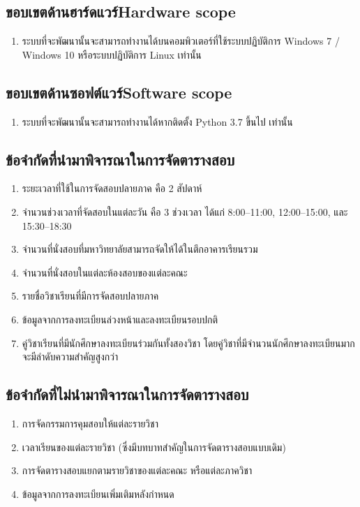 \subsection{\ifcpe ขอบเขตด้านฮาร์ดแวร์\else Hardware scope\fi}
\begin{enumerate}
    \item ระบบที่จะพัฒนานั้นจะสามารถทำงานได้บนคอมพิวเตอร์ที่ใช้ระบบปฏิบัติการ Windows 7 / Windows 10 หรือระบบปฏิบัติการ Linux เท่านั้น
\end{enumerate}
\subsection{\ifcpe ขอบเขตด้านซอฟต์แวร์\else Software scope\fi}
\begin{enumerate}
    \item ระบบที่จะพัฒนานั้นจะสามารถทำงานได้หากติดตั้ง Python 3.7 ขึ้นไป เท่านั้น 
\end{enumerate}
\subsection{ข้อจำกัดที่นำมาพิจารณาในการจัดตารางสอบ}
\begin{enumerate}
    \item ระยะเวลาที่ใช้ในการจัดสอบปลายภาค คือ 2 สัปดาห์
    \item จำนวนช่วงเวลาที่จัดสอบในแต่ละวัน คือ 3 ช่วงเวลา ได้แก่ 8:00--11:00, 12:00--15:00, 
    และ 15:30--18:30
    \item จำนวนที่นั่งสอบที่มหาวิทยาลัยสามารถจัดให้ได้ในตึกอาคารเรียนรวม
    \item จำนวนที่นั่งสอบในแต่ละห้องสอบของแต่ละคณะ
    \item รายชื่อวิชาเรียนที่มีการจัดสอบปลายภาค
    \item ข้อมูลจากการลงทะเบียนล่วงหน้าและลงทะเบียนรอบปกติ
    \item คู่วิชาเรียนที่มีนักศึกษาลงทะเบียนร่วมกันทั้งสองวิชา โดยคู่วิชาที่มีจำนวนนักศึกษาลงทะเบียนมาก จะมีลำดับความสำคัญสูงกว่า
\end{enumerate}

\subsection{ข้อจำกัดที่ไม่นำมาพิจารณาในการจัดตารางสอบ}
\begin{enumerate}
    \item การจัดกรรมการคุมสอบให้แต่ละรายวิชา
    \item เวลาเรียนของแต่ละรายวิชา (ซึ่งมีบทบาทสำคัญในการจัดตารางสอบแบบเดิม)
    \item การจัดตารางสอบแยกตามรายวิชาของแต่ละคณะ หรือแต่ละภาควิชา
    \item ข้อมูลจากการลงทะเบียนเพิ่มเติมหลังกำหนด
\end{enumerate}


